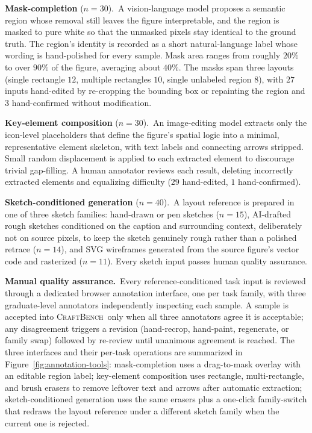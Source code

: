\documentclass{article}
\newcommand{\CrafterBench}{\textsc{CraftBench}\xspace}
\begin{document}
\noindent\textbf{Mask-completion} ($n{=}30$).\
A vision-language model proposes a semantic region whose removal still leaves the figure interpretable, and the region is masked to pure white so that the unmasked pixels stay identical to the ground truth. The region's identity is recorded as a short natural-language label whose wording is hand-polished for every sample. Mask area ranges from roughly $20\%$ to over $90\%$ of the figure, averaging about $40\%$. The masks span three layouts (single rectangle $12$, multiple rectangles $10$, single unlabeled region $8$), with $27$ inputs hand-edited by re-cropping the bounding box or repainting the region and $3$ hand-confirmed without modification.

\noindent\textbf{Key-element composition} ($n{=}30$).\
An image-editing model extracts only the icon-level placeholders that define the figure's spatial logic into a minimal, representative element skeleton, with text labels and connecting arrows stripped. Small random displacement is applied to each extracted element to discourage trivial gap-filling. A human annotator reviews each result, deleting incorrectly extracted elements and equalizing difficulty ($29$ hand-edited, $1$ hand-confirmed).

\noindent\textbf{Sketch-conditioned generation} ($n{=}40$).\
A layout reference is prepared in one of three sketch families: hand-drawn or pen sketches ($n{=}15$), AI-drafted rough sketches conditioned on the caption and surrounding context, deliberately not on source pixels, to keep the sketch genuinely rough rather than a polished retrace ($n{=}14$), and SVG wireframes generated from the source figure's vector code and rasterized ($n{=}11$). Every sketch input passes human quality assurance.

\noindent\textbf{Manual quality assurance.}\
Every reference-conditioned task input is reviewed through a dedicated browser annotation interface, one per task family, with three graduate-level annotators independently inspecting each sample. A sample is accepted into \CrafterBench\ only when all three annotators agree it is acceptable; any disagreement triggers a revision (hand-recrop, hand-paint, regenerate, or family swap) followed by re-review until unanimous agreement is reached. The three interfaces and their per-task operations are summarized in Figure~\ref{fig:annotation-tools}: mask-completion uses a drag-to-mask overlay with an editable region label; key-element composition uses rectangle, multi-rectangle, and brush erasers to remove leftover text and arrows after automatic extraction; sketch-conditioned generation uses the same erasers plus a one-click family-switch that redraws the layout reference under a different sketch family when the current one is rejected.
\end{document}

